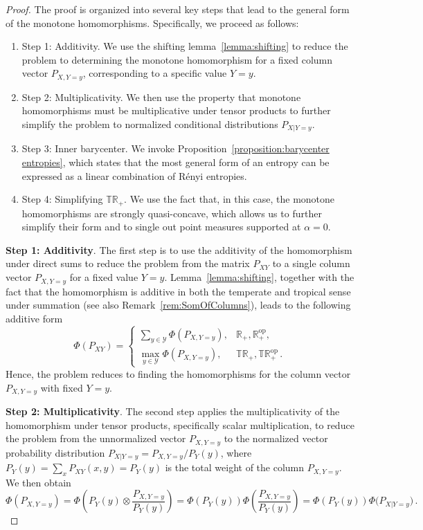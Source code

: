 \documentclass[aps,pra,11pt,onecolumn,nofootinbib,tightenlines]{revtex4-2}
\theoremstyle{definition}
\newcommand{\Y}{\mathcal{Y}}
\begin{document}
\begin{proof}
The proof is organized into several key steps that lead to the general form of the monotone homomorphisms. Specifically, we proceed as follows:
\begin{enumerate}
    \item Step 1: Additivity. We use the shifting lemma~\ref{lemma:shifting} to reduce the problem to determining the monotone homomorphism for a fixed column vector \( P_{X,Y=y} \), corresponding to a specific value \( Y = y \).
    \item Step 2: Multiplicativity. We then use the property that monotone homomorphisms must be multiplicative under tensor products to further simplify the problem to normalized conditional distributions \( P_{X|Y=y} \).
    \item Step 3: Inner barycenter. We invoke Proposition~\ref{proposition:barycenter entropies}, which states that the most general form of an entropy can be expressed as a linear combination of Rényi entropies. 
     \item Step 4: Simplifying $\mathbb{TR}_+$. We use the fact that, in this case, the monotone homomorphisms are strongly quasi-concave, which allows us to further simplify their form and to single out point measures supported at $\alpha=0$.
\end{enumerate}

\bigskip
\bigskip

 
\noindent\textbf{Step 1: Additivity}. The first step is to use the additivity of the homomorphism under direct sums to reduce the problem from the matrix $P_{XY}$ to a single column vector $P_{X,Y=y}$ for a fixed value $Y = y$.
Lemma~\ref{lemma:shifting}, together with the fact that the homomorphism is additive in both the temperate and tropical sense under summation (see also Remark~\ref{rem:SomOfColumns}), leads to the following additive form
\begin{equation}\label{eq:additivity}
\Phi(P_{XY}) =
\begin{cases}
\sum_{y \in \Y} \Phi(P_{X,Y=y}), & \mathbb{R}_+,\mathbb{R}_+^{\mathrm{op}}, \\
\max_{y \in \Y} \Phi(P_{X,Y=y}), & \mathbb{TR}_+,\mathbb{TR}_+^{\mathrm{op}} \,.
\end{cases}
\end{equation}
Hence, the problem reduces to finding the homomorphisms for the column vector $P_{X,Y=y}$ with fixed $Y=y$.

\bigskip
\bigskip
 \noindent\textbf{Step 2: Multiplicativity}. The second step applies the multiplicativity of the homomorphism under tensor products, specifically scalar multiplication, to reduce the problem from the unnormalized vector $P_{X,Y=y}$ to the normalized vector probability distribution $P_{X|Y=y} = P_{X,Y=y}/P_Y(y)$, where $P_Y(y) = \sum_x P_{XY}(x,y) = P_Y(y)$ is the total weight of the column $P_{X,Y=y}$. We then obtain
 \begin{equation}\label{eq:normalize}
     \Phi(P_{X,Y=y}) = \Phi\left(P_Y(y) \otimes \frac{P_{X,Y=y}}{P_Y(y)}\right) =\Phi(P_Y(y)) \Phi\left(\frac{P_{X,Y=y}}{P_Y(y)}\right) = \Phi(P_Y(y)) \Phi\big(P_{X|Y=y}\big) \,.
 \end{equation}
 

\end{proof}
\end{document}
